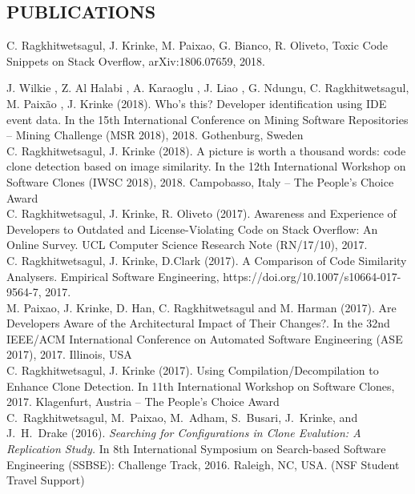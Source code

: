 \documentclass[margin, 10pt]{res} %
\begin{document}
\begin{resume}

\section{PUBLICATIONS}  

C. Ragkhitwetsagul, J. Krinke, M. Paixao, G. Bianco, R. Oliveto, Toxic Code Snippets on Stack Overflow, arXiv:1806.07659, 2018.

J. Wilkie , Z. Al Halabi , A. Karaoglu , J. Liao , G. Ndungu, C. Ragkhitwetsagul, M. Paixão , J. Krinke (2018). Who's this? Developer identification using IDE event data. In the 15th International Conference on Mining Software Repositories -- Mining Challenge (MSR 2018), 2018. Gothenburg, Sweden 
\vspace{2mm} \\
C. Ragkhitwetsagul, J. Krinke (2018). A picture is worth a thousand words: code clone detection based on image similarity. In the 12th International Workshop on Software Clones (IWSC 2018), 2018. Campobasso, Italy -- The People's Choice Award\vspace{2mm} \\
C. Ragkhitwetsagul, J. Krinke, R. Oliveto (2017). Awareness and Experience of Developers to Outdated and License-Violating Code on Stack Overflow: An Online Survey. UCL Computer Science Research Note (RN/17/10), 2017. \vspace{2mm} \\
C. Ragkhitwetsagul, J. Krinke, D.Clark (2017). A Comparison of Code Similarity Analysers. Empirical Software Engineering, https://doi.org/10.1007/s10664-017-9564-7, 2017. \vspace{2mm} \\
M. Paixao, J. Krinke, D. Han, C. Ragkhitwetsagul and M. Harman (2017). Are Developers Aware of the Architectural Impact of Their Changes?. In the 32nd IEEE/ACM International Conference on Automated Software Engineering (ASE 2017), 2017. Illinois, USA \vspace{2mm} \\
C. Ragkhitwetsagul, J. Krinke (2017). Using Compilation/Decompilation to Enhance Clone Detection. In 11th International Workshop on Software Clones, 2017. Klagenfurt, Austria -- The People's Choice Award \vspace{2mm} \\
C.~Ragkhitwetsagul, M.~Paixao, M.~Adham, S.~Busari, J.~Krinke, and J.~H.~Drake (2016). \textit{Searching for Configurations in Clone Evalution: A Replication Study.} In 8th International Symposium on Search-based Software Engineering (SSBSE): Challenge Track, 2016. Raleigh, NC, USA. (NSF Student Travel Support) \vspace{2mm} \\

\end{resume}
\end{document}
